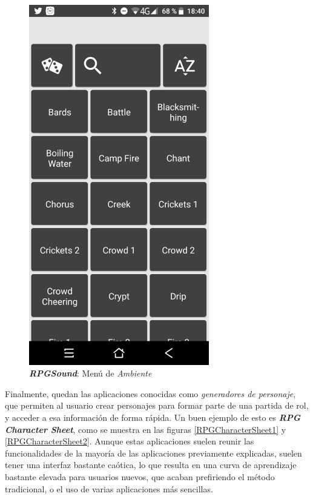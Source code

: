 \begin{figure}[H]
\begin{minipage}{0.3\textwidth}
        \includegraphics[width=0.7\textwidth]{Images/RPGSound_2.jpeg}
        \caption{\textit{\textbf{RPGSound}}: Menú de \textit{Ambiente}}
        \label{RPGSound2} 
    \end{minipage}
\end{figure}

Finalmente, quedan las aplicaciones conocidas como \textit{generadores de
personaje}, que permiten al usuario crear personajes para formar parte de 
una partida de rol, y acceder a esa información de forma rápida. Un buen 
ejemplo de esto es \textit{\textbf{RPG Character Sheet}}, como se muestra en 
las figuras \ref*{RPGCharacterSheet1} y \ref*{RPGCharacterSheet2}. Aunque estas aplicaciones 
suelen reunir las funcionalidades de la mayoría de las aplicaciones previamente 
explicadas, suelen tener una interfaz bastante caótica, lo que resulta en una 
curva de aprendizaje bastante elevada para usuarios nuevos, que acaban 
prefiriendo el método tradicional, o el uso de varias aplicaciones más sencillas.

